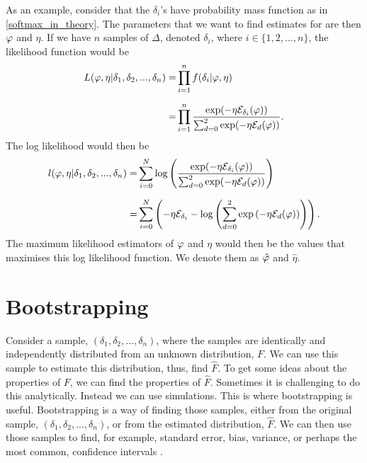 As an example, consider that the $\delta_i$'s have probability mass function as in \eqref{softmax_in_theory}. The parameters that we want to find estimates for are then $\varphi$ and $\eta$. If we have $n$ samples of $\Delta$, denoted $\delta_i$, where $i \in \{1,2,...,n\}$,
the likelihood function would be
\begin{equation*}
    \begin{aligned}
        L(\varphi,\eta|\delta_1,\delta_2,...,\delta_n) 
        =& \prod_{i=1}^{n} f(\delta_i|\varphi,\eta)\\[6pt]
        =& \prod_{i=1}^{n}
        \frac{\text{exp}(- \eta \mathcal{E}_{\delta_i}(\varphi))}{\sum_{d=0}^{2} \text{exp}(-\eta \mathcal{E}_{d}(\varphi))}.
    \end{aligned}
\end{equation*}
The log likelihood would then be
\begin{equation*}
    \begin{aligned}
        l(\varphi,\eta|\delta_1,\delta_2,...,\delta_n) =& \sum_{i=0}^N \text{log}\left( \frac{\text{exp}({-\eta \mathcal{E}_{\delta_{i}}(\varphi))}}
        {\sum_{d=0}^{2} \text{exp}(-\eta \mathcal{E}_{d}(\varphi))}\right) \\[6pt]
        =& \sum_{i=0}^N \left(
        -\eta \mathcal{E}_{\delta_{i}} 
        - \text{log} \left( \sum_{d=0}^{2} \text{exp} \left(-\eta \mathcal{E}_{d}(\varphi)\right) \right) \right).
    \end{aligned}
\end{equation*}
The maximum likelihood estimators of $\varphi$ and $\eta$ would then be the values that maximises this log likelihood function. We denote them as $\hat{\varphi}$ and $\hat{\eta}$.




\section{Bootstrapping}
\label{section_theory_bootstrap}
Consider a sample, $(\delta_1,\delta_2,...,\delta_n)$, where the samples are identically and independently distributed from an unknown distribution, $F$. We can use this sample to estimate this distribution, thus, find $\hat{F}$. To get some ideas about the properties of $F$, we can find the properties of $\hat{F}$. Sometimes it is challenging to do this analytically. Instead we can use simulations. This is where bootstrapping is useful. Bootstrapping is a way of finding those samples, either from the original sample, $(\delta_1,\delta_2,...,\delta_n)$, or from the estimated distribution, $\hat{F}$. We can then use those samples to find, for example, standard error, bias, variance, or perhaps the most common, confidence intervals \citep{bootstrap}.



